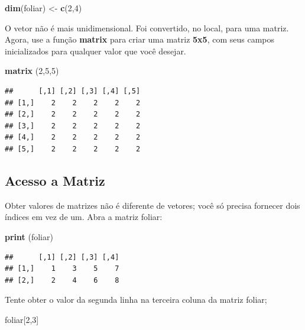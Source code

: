 \documentclass[]{book}
\newenvironment{Shaded}{\begin{snugshade}}{\end{snugshade}}
\newcommand{\DecValTok}[1]{\textcolor[rgb]{0.00,0.00,0.81}{#1}}
\newcommand{\KeywordTok}[1]{\textcolor[rgb]{0.13,0.29,0.53}{\textbf{#1}}}
\newcommand{\NormalTok}[1]{#1}
\newcommand{\StringTok}[1]{\textcolor[rgb]{0.31,0.60,0.02}{#1}}
\begin{document}
\begin{Shaded}
\begin{Highlighting}[]
\KeywordTok{dim}\NormalTok{(foliar) <-}\StringTok{ }\KeywordTok{c}\NormalTok{(}\DecValTok{2}\NormalTok{,}\DecValTok{4}\NormalTok{)}
\end{Highlighting}
\end{Shaded}

O vetor não é mais unidimensional. Foi convertido, no local, para uma matriz.
Agora, use a função \textbf{matrix} para criar uma matriz \textbf{5x5}, com seus campos inicializados para qualquer valor que você desejar.

\begin{Shaded}
\begin{Highlighting}[]
\KeywordTok{matrix}\NormalTok{ (}\DecValTok{2}\NormalTok{,}\DecValTok{5}\NormalTok{,}\DecValTok{5}\NormalTok{)}
\end{Highlighting}
\end{Shaded}

\begin{verbatim}
##      [,1] [,2] [,3] [,4] [,5]
## [1,]    2    2    2    2    2
## [2,]    2    2    2    2    2
## [3,]    2    2    2    2    2
## [4,]    2    2    2    2    2
## [5,]    2    2    2    2    2
\end{verbatim}

\hypertarget{acesso-a-matriz}{%
\subsection{Acesso a Matriz}\label{acesso-a-matriz}}

Obter valores de matrizes não é diferente de vetores; você só precisa fornecer dois índices em vez de um. Abra a matriz foliar:

\begin{Shaded}
\begin{Highlighting}[]
\KeywordTok{print}\NormalTok{ (foliar)}
\end{Highlighting}
\end{Shaded}

\begin{verbatim}
##      [,1] [,2] [,3] [,4]
## [1,]    1    3    5    7
## [2,]    2    4    6    8
\end{verbatim}

Tente obter o valor da segunda linha na terceira coluna da matriz foliar;

\begin{Shaded}
\begin{Highlighting}[]
\NormalTok{foliar[}\DecValTok{2}\NormalTok{,}\DecValTok{3}\NormalTok{]}
\end{Highlighting}
\end{Shaded}
\end{document}
